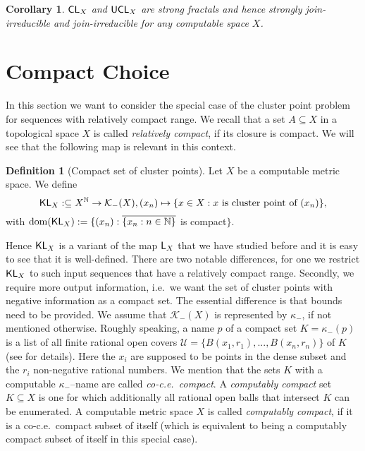 \documentclass[a4paper]{amsart}
\def\KK{{\mathcal K}}
\def\UU{{\mathcal U}}
\def\IN{{\mathbb{N}}}
\def\In{\subseteq}
\def\dom{{\rm dom}}
\def\L{\text{\rm\sffamily L}}
\def\CL{\text{\rm\sffamily CL}}
\def\KL{\text{\rm\sffamily KL}}
\def\UCL{\text{\rm\sffamily UCL}}
\newtheorem{corollary}[theorem]{Corollary}
\theoremstyle{definition}
\newtheorem{definition}[theorem]{Definition}
\begin{document}
\begin{corollary}
\label{cor:cluster-fractal}
$\CL_X$ and $\UCL_X$ are strong fractals and hence strongly join-irreducible and join-irreducible for 
any computable space $X$.
\end{corollary}


\section{Compact Choice}
\label{sec:compact-choice}

In this section we want to consider the special case of the cluster point problem
for sequences with relatively compact range. We recall that a set $A\In X$ in a topological
space $X$ is called {\em relatively compact}, if its closure is compact. We will see
that the following map is relevant in this context.

\begin{definition}[Compact set of cluster points]
Let $X$ be a computable metric space. We define
\[\KL_X:\In X^\IN\to\KK_-(X),(x_n)\mapsto\{x\in X:\mbox{$x$ is cluster point of $(x_n)$}\},\]
with $\dom(\KL_X):=\{(x_n):\overline{\{x_n:n\in\IN\}}$ is compact$\}$. 
\end{definition}

Hence $\KL_X$ is a variant of the map $\L_X$ that we have studied before and it is easy
to see that it is well-defined.
There are two notable differences, for one we restrict $\KL_X$ to such input sequences that
have a relatively compact range. Secondly, we require more output information, i.e.\ we
want the set of cluster points with negative information as a compact set.
The essential difference is that bounds need to be provided. 
We assume that $\KK_-(X)$ is represented by $\kappa_-$, if not mentioned otherwise.
Roughly speaking, a name $p$ of a compact set $K=\kappa_-(p)$ is 
a list of all finite rational open covers $\UU=\{B(x_1,r_1),...,B(x_n,r_n)\}$ of $K$ (see \cite{BP03} for details).
Here the $x_i$ are supposed to be points in the dense subset and the $r_i$ non-negative rational numbers.
We mention that the sets $K$ with a computable $\kappa_-$--name are called {\em co-c.e.\ compact}.
A {\em computably compact} set $K\In X$ is one for which additionally all rational open balls
that intersect $K$ can be enumerated. A computable metric space $X$ is called {\em computably compact},
if it is a co-c.e.\ compact subset of itself (which is equivalent to being a computably compact subset of itself
in this special case).
\end{document}
